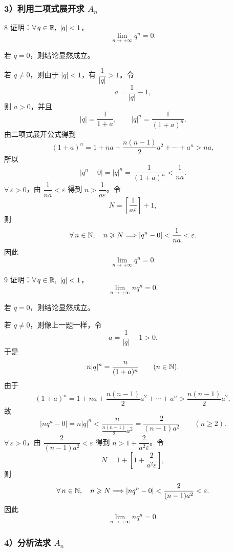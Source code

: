\subsubsection*{\texorpdfstring{3）利用二项式展开求 \(A_n\)}{3）利用二项式展开求 An}}

\begin{sourceexample}{8}
证明：\(\forall\,q\in\R,\ |q|<1\)，
\[
\lim_{n\to+\infty}q^n=0.
\]

若 \(q=0\)，则结论显然成立。

若 \(q\neq0\)，则由于 \(|q|<1\)，有 \(\dfrac1{|q|}>1\)。令
\[
a=\frac1{|q|}-1,
\]
则 \(a>0\)，并且
\[
|q|=\frac1{1+a},\qquad |q|^n=\frac1{(1+a)^n}.
\]
由二项式展开公式得到
\[
(1+a)^n=1+na+\frac{n(n-1)}2a^2+\cdots+a^n>na,
\]
所以
\[
|q^n-0|=|q|^n=\frac1{(1+a)^n}<\frac1{na}.
\]
\(\forall\,\varepsilon>0\)，由 \(\dfrac1{na}<\varepsilon\) 得到
\(n>\dfrac1{a\varepsilon}\)。令
\[
N=\left[\frac1{a\varepsilon}\right]+1,
\]
则
\[
\forall\,n\in\mathbb{N},\quad n\geqslant N
\Longrightarrow |q^n-0|<\frac1{na}<\varepsilon.
\]
因此
\[
\lim_{n\to+\infty}q^n=0.
\]
\end{sourceexample}

\begin{sourceexample}{9}
证明：\(\forall\,q\in\R,\ |q|<1\)，
\[
\lim_{n\to+\infty}nq^n=0.
\]

若 \(q=0\)，则结论显然成立。

若 \(q\neq0\)，则像上一题一样，令
\[
a=\frac1{|q|}-1>0.
\]
于是
\[
n|q|^n=\frac{n}{(1+a)^n}\qquad(n\in\mathbb{N}).
\]
由于
\[
(1+a)^n
=1+na+\frac{n(n-1)}2a^2+\cdots+a^n
>\frac{n(n-1)}2a^2,
\]
故
\[
|nq^n-0|
=n|q|^n
<\frac{n}{\frac{n(n-1)}2a^2}
=\frac2{(n-1)a^2}
\qquad(n\geqslant2).
\]
\(\forall\,\varepsilon>0\)，由
\(\dfrac2{(n-1)a^2}<\varepsilon\) 得到
\(n>1+\dfrac2{a^2\varepsilon}\)。令
\[
N=1+\left[1+\frac2{a^2\varepsilon}\right],
\]
则
\[
\forall\,n\in\mathbb{N},\quad n\geqslant N
\Longrightarrow
|nq^n-0|<\frac2{(n-1)a^2}<\varepsilon.
\]
因此
\[
\lim_{n\to+\infty}nq^n=0.
\]
\end{sourceexample}

\subsubsection*{\texorpdfstring{4）分析法求 \(A_n\)}{4）分析法求 An}}


